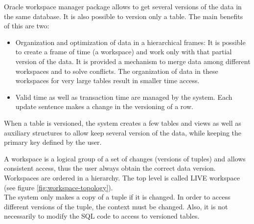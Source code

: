 Oracle workspace manager \cite{OraE118602} package allows to get several versions of the data in the same database. It is also possible to version only a table. The main benefits of this are two:

\begin{itemize}
\item
Organization and optimization of data in a hierarchical frames: It is possible to create a frame of time (a workspace) and work only with that partial version of the data. It is provided a mechanism to merge data among different workspaces and to solve conflicts. The organization of data in these workspaces for very large tables result in smaller time access.
\item
Valid time as well as transaction time are managed by the system. Each update sentence makes a change in the versioning of a row.
\end{itemize}

When a table is versioned, the system creates a few tables and views as well as auxiliary structures to allow keep several version of the data, while keeping the primary key defined by the user.

A workspace is a logical group of a set of changes (versions of tuples) and allows consistent access, thus the user always obtain the correct data version. Workspaces are ordered in a hierarchy. The top level is called LIVE workspace (see figure \ref{fig:workspace-topology}).  \\

The system only makes a copy of a tuple if it is changed. In order to access different versions of the tuple, the context must be changed. Also, it is not necessarily to modify the SQL code to access to versioned tables.\\

